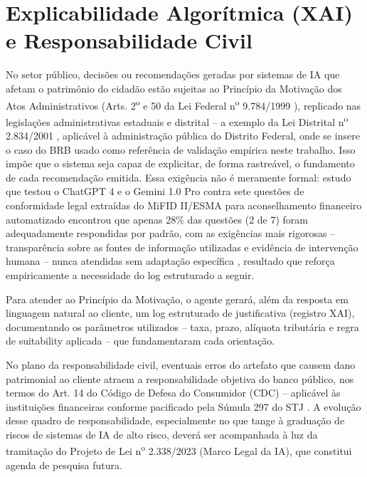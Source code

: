 \section{Explicabilidade Algor\'itmica (XAI) e Responsabilidade Civil}
\label{sec:xai}

No setor p\'ublico, decis\~oes ou recomenda\c{c}\~oes geradas por
sistemas de IA que afetam o patrim\^onio do cidad\~ao est\~ao sujeitas ao
Princ\'ipio da Motiva\c{c}\~ao dos Atos Administrativos (Arts.
2\textsuperscript{o} e 50 da Lei Federal n\textsuperscript{o}
9.784/1999 \autocite{lei9784}), replicado nas legisla\c{c}\~oes
administrativas estaduais e distrital -- a exemplo da Lei Distrital
n\textsuperscript{o} 2.834/2001 \autocite{leidistrital2834}, aplic\'avel
\`a administra\c{c}\~ao p\'ublica do Distrito Federal, onde se insere o
caso do BRB usado como refer\^encia de valida\c{c}\~ao emp\'irica neste
trabalho.
Isso imp\~oe que o sistema seja capaz de explicitar, de forma
rastre\'avel, o fundamento de cada recomenda\c{c}\~ao emitida. Essa
exig\^encia n\~ao \'e meramente formal: estudo que testou o ChatGPT 4 e
o Gemini 1.0 Pro contra sete quest\~oes de conformidade legal extra\'idas
do MiFID II/ESMA para aconselhamento financeiro automatizado encontrou
que apenas 28\% das quest\~oes (2 de 7) foram adequadamente respondidas
por padr\~ao, com as exig\^encias mais rigorosas -- transpar\^encia
sobre as fontes de informa\c{c}\~ao utilizadas e evid\^encia de
interven\c{c}\~ao humana -- nunca atendidas sem adapta\c{c}\~ao
espec\'ifica \autocite{vilone2024}, resultado que refor\c{c}a
empiricamente a necessidade do log estruturado a seguir.

Para atender ao Princ\'ipio da Motiva\c{c}\~ao, o agente gerar\'a, al\'em
da resposta em linguagem natural ao cliente, um log estruturado de
justificativa (registro XAI), documentando os par\^ametros utilizados --
taxa, prazo, al\'iquota tribut\'aria e regra de suitability aplicada --
que fundamentaram cada orienta\c{c}\~ao.

No plano da responsabilidade civil, eventuais erros do artefato que
causem dano patrimonial ao cliente atraem a responsabilidade objetiva do
banco p\'ublico, nos termos do Art. 14 do C\'odigo de Defesa do Consumidor (CDC) --
aplic\'avel \`as institui\c{c}\~oes financeiras conforme pacificado pela
S\'umula 297 do STJ \autocite{stj2004}. A evolu\c{c}\~ao desse quadro de
responsabilidade, especialmente no que tange \`a gradua\c{c}\~ao de
riscos de sistemas de IA de alto risco, dever\'a ser acompanhada \`a luz
da tramita\c{c}\~ao do Projeto de Lei n\textsuperscript{o} 2.338/2023
\autocite{senado2338} (Marco Legal da IA), que constitui agenda de pesquisa futura.
